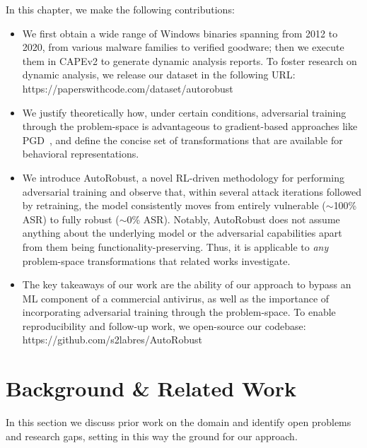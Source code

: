 In this chapter, we make the following contributions:
\begin{itemize}
    \item We first obtain a wide range of Windows binaries spanning from 2012 to 2020, from various malware families to verified goodware; then we execute them in CAPEv2 to generate dynamic analysis reports. To foster research on dynamic analysis, we release our dataset in the following URL: https://paperswithcode.com/dataset/autorobust
    \item We justify theoretically how, under certain conditions, adversarial training through the problem-space is advantageous to gradient-based approaches like PGD~\cite{madry2017towards}, and define the concise set of transformations that are available for behavioral representations.
    \item We introduce AutoRobust, a novel RL-driven methodology for performing adversarial training and observe that, within several attack iterations followed by retraining, the model consistently moves from entirely vulnerable ($\sim$100\% ASR) to fully robust ($\sim$0\% ASR). Notably, AutoRobust does not assume anything about the underlying model or the adversarial capabilities apart from them being functionality-preserving. Thus, it is applicable to \textit{any} problem-space transformations that related works investigate.
    \item The key takeaways of our work are the ability of our approach to bypass an ML component of a commercial antivirus, as well as the importance of incorporating adversarial training through the problem-space. To enable reproducibility and follow-up work, we open-source our codebase: https://github.com/s2labres/AutoRobust
\end{itemize}

\section{Background \& Related Work}
\label{sec:backgroundauto}
In this section we discuss prior work on the domain and identify open problems and research gaps, setting in this way the ground for our approach.

